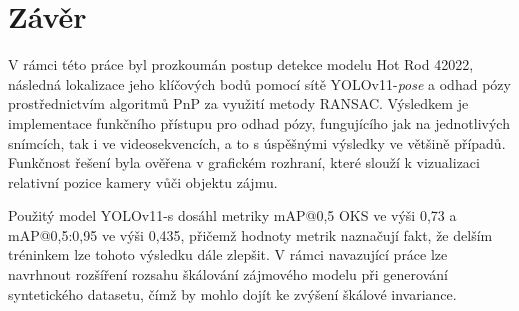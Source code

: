 \chapter{Závěr}
\label{sec:Chapter6}
V rámci této práce byl prozkoumán postup detekce modelu Hot Rod 42022, následná lokalizace jeho klíčových bodů pomocí sítě YOLOv11-\textit{pose} a odhad pózy prostřednictvím algoritmů PnP za využití metody RANSAC. Výsledkem je implementace funkčního přístupu pro odhad pózy, fungujícího jak na jednotlivých snímcích, tak i ve videosekvencích, a to s úspěšnými výsledky ve většině případů. Funkčnost řešení byla ověřena v grafickém rozhraní, které slouží k vizualizaci relativní pozice kamery vůči objektu zájmu.

Použitý model YOLOv11-s dosáhl metriky mAP@0,5 OKS ve výši 0,73 a mAP@0,5:0,95 ve výši 0,435, přičemž hodnoty metrik naznačují fakt, že delším tréninkem lze tohoto výsledku dále zlepšit. V rámci navazující práce lze navrhnout rozšíření rozsahu škálování zájmového modelu při generování syntetického datasetu, čímž by mohlo dojít ke zvýšení škálové invariance.